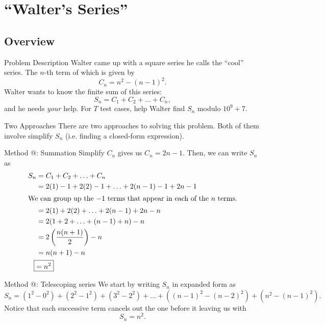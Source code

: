 \documentclass{beamer}
\makeatletter
\newcommand*{\rom}[1]{\expandafter\@slowromancap\romannumeral #1@}
\makeatother
\begin{document}
\section{``Walter's Series''}
\subsection{Overview}
\begin{frame}{Problem Description}
    Walter came up with a square series he calls the ``cool'' series. The $n$-th term of which is given by
    $$C_n=n^2-(n-1)^2.$$
    Walter wants to know the finite sum of this series: $$S_n=C_1+C_2+\ldots+C_n,$$
    and he needs \textit{your} help. For $T$ test cases, help Walter find $S_n$ modulo $10^9+7$.
\end{frame}

\begin{frame}{Two Approaches}
    There are two approaches to solving this problem. Both of them involve simplify $S_n$ (i.e. finding a closed-form expression).
\end{frame}

\begin{frame}{Method \rom{1}: Summation}
    Simplify $C_n$ gives us $C_n=2n-1$. Then, we can write $S_n$ as
    \begin{align*}
        S_n&=C_1+C_2+\ldots+C_n\\
        &=2(1)-1+2(2)-1+\ldots+2(n-1)-1+2n-1\\
        \shortintertext{We can group up the $-1$ terms that appear in each of the $n$ terms.}
        &=2(1)+2(2)+\ldots+2(n-1)+2n-n\\
        &=2(1+2+\ldots+(n-1)+n)-n\\
        &=2\left(\frac{n(n+1)}{2}\right)-n\\
        &=n(n+1)-n\\
        \Aboxed{&=n^2}
    \end{align*}
\end{frame}

\begin{frame}{Method \rom{2}: Telescoping series}
    We start by writing $S_n$ in expanded form as
    \begin{dmath}
        S_n=\left(1^2-0^2\right)+\left(2^2-1^2\right)+\left(3^2-2^2\right)+\ldots+\left((n-1)^2-(n-2)^2\right)+\left(n^2-(n-1)^2\right).
    \end{dmath}
    Notice that each successive term cancels out the one before it leaving us with $$S_n=n^2.$$
\end{frame}
\end{document}
